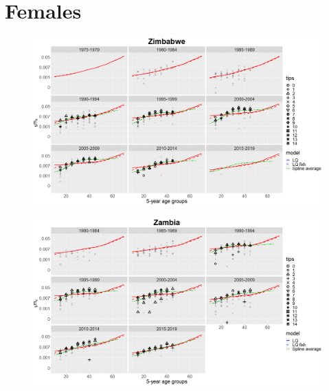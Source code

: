\documentclass[12pt,a4paper]{article}
\begin{document}
\section*{\centering Females}
\begin{figure}[H]
\includegraphics[width = \linewidth]{Burkina Faso/8/zimbabwe females.png}
\end{figure}
\begin{figure}[H]
\includegraphics[width = \linewidth]{Burkina Faso/8/zambia females.png}
\end{figure}
\end{document}
